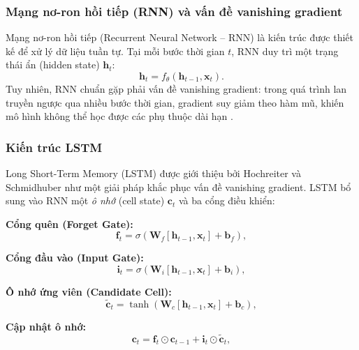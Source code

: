 \subsubsection{Mạng nơ-ron hồi tiếp (RNN) và vấn đề vanishing gradient}

Mạng nơ-ron hồi tiếp (Recurrent Neural Network -- RNN) là kiến trúc được thiết kế để xử lý dữ liệu tuần tự. Tại mỗi bước thời gian $t$, RNN duy trì một trạng thái ẩn (hidden state) $\mathbf{h}_t$:
\begin{equation}
    \mathbf{h}_t = f_\theta(\mathbf{h}_{t-1}, \mathbf{x}_t).
    \label{eq:rnn}
\end{equation}
Tuy nhiên, RNN chuẩn gặp phải vấn đề vanishing gradient: trong quá trình lan truyền ngược qua nhiều bước thời gian, gradient suy giảm theo hàm mũ, khiến mô hình không thể học được các phụ thuộc dài hạn \citep{bengio1994learning}.

\subsubsection{Kiến trúc LSTM}

Long Short-Term Memory (LSTM) được giới thiệu bởi Hochreiter và Schmidhuber \citep{hochreiter1997long} như một giải pháp khắc phục vấn đề vanishing gradient. LSTM bổ sung vào RNN một \textit{ô nhớ} (cell state) $\mathbf{c}_t$ và ba cổng điều khiển:

\textbf{Cổng quên (Forget Gate):}
\begin{equation}
    \mathbf{f}_t = \sigma\!\left(\mathbf{W}_f [\mathbf{h}_{t-1}, \mathbf{x}_t] + \mathbf{b}_f\right),
    \label{eq:forget_gate}
\end{equation}

\textbf{Cổng đầu vào (Input Gate):}
\begin{equation}
    \mathbf{i}_t = \sigma\!\left(\mathbf{W}_i [\mathbf{h}_{t-1}, \mathbf{x}_t] + \mathbf{b}_i\right),
    \label{eq:input_gate}
\end{equation}

\textbf{Ô nhớ ứng viên (Candidate Cell):}
\begin{equation}
    \tilde{\mathbf{c}}_t = \tanh\!\left(\mathbf{W}_c [\mathbf{h}_{t-1}, \mathbf{x}_t] + \mathbf{b}_c\right),
    \label{eq:candidate_cell}
\end{equation}

\textbf{Cập nhật ô nhớ:}
\begin{equation}
    \mathbf{c}_t = \mathbf{f}_t \odot \mathbf{c}_{t-1} + \mathbf{i}_t \odot \tilde{\mathbf{c}}_t,
    \label{eq:cell_update}
\end{equation}

